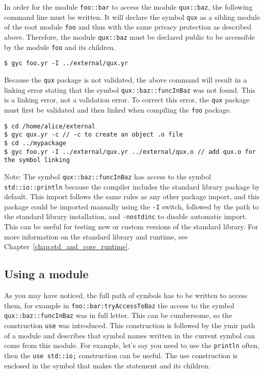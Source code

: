 In order for the module \texttt{foo::bar} to access the module
\texttt{qux::baz}, the following command line must be written. It will declare
the symbol \texttt{qux} as a sibling module of the root module \texttt{foo} and
thus with the same privacy protection as described above. Therefore, the module
\texttt{qux::baz} must be declared public to be accessible by the module
\texttt{foo} and its children.

\begin{lstlisting}[style=intermediateVerb]
$ gyc foo.yr -I ../external/qux.yr
\end{lstlisting}

Because the \texttt{qux} package is not validated, the above command will result
in a linking error stating that the symbol \texttt{qux::baz::funcInBaz} was not
found. This is a linking error, not a validation error. To correct this error,
the \texttt{qux} package must first be validated and then linked when compiling
the \texttt{foo} package.

\begin{lstlisting}[style=intermediateVerb]
$ cd /home/alice/external
$ gyc qux.yr -c // -c to create an object .o file
$ cd ../mypackage
$ gyc foo.yr -I ../external/qux.yr ../external/qux.o // add qux.o for the symbol linking
\end{lstlisting}

Note: The symbol \texttt{qux::baz::funcInBaz} has access to the symbol
\texttt{std::io::println} because the compiler includes the standard library
package by default. This import follows the same rules as any other package
import, and this package could be imported manually using the \texttt{-I}
switch, followed by the path to the standard library installation, and
\texttt{-nostdinc} to disable automatic import. This can be useful for testing
new or custom versions of the standard library. For more information on the
standard library and runtime, see Chapter~\ref{chap:std_and_core_runtime}.

\subsection {Using a module}

As you may have noticed, the full path of symbols has to be written to access
them, for example in \texttt{foo::bar:tryAccessToBaz} the access to the symbol
\texttt {qux::baz::funcInBaz} was in full letter. This can be cumbersome, so the
construction \texttt{use} was introduced. This construction is followed by the
ymir path of a module and describes that symbol names written in the current
symbol can come from this module. For example, let's say you need to use the
\texttt{println} often, then the \texttt{use std::io;} construction can be
useful. The use construction is enclosed in the symbol that makes the statement
and its children.

